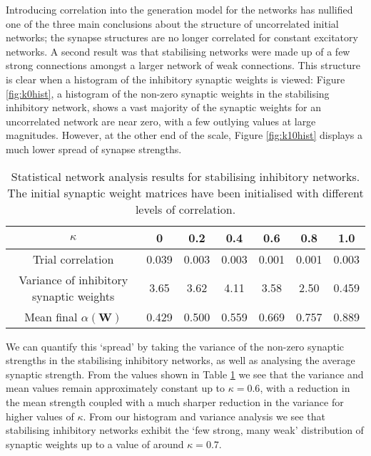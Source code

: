 \documentclass[12pt, a4paper]{article}
\begin{document}
Introducing correlation into the generation model for the networks has nullified one of the three main conclusions about the structure of uncorrelated initial networks; the synapse structures are no longer correlated for constant excitatory networks.  A second result was that stabilising networks were made up of a few strong connections amongst a larger network of weak connections.  This structure is clear when a histogram of the inhibitory synaptic weights is viewed: Figure \ref{fig:k0hist}, a histogram of the non-zero synaptic weights in the stabilising inhibitory network, shows a vast majority of the synaptic weights for an uncorrelated network are near zero, with a few outlying values at large magnitudes.  However,  at the other end of the scale, Figure \ref{fig:k10hist} displays a much lower spread of synapse strengths. 

\begin{table}
    \centering
            \begin{tabular}{|c || c c c c c c|}
                \hline
                                $\kappa$     &   0      &  0.2   &    0.4   &   0.6   &   0.8   &   1.0  \\
                \hline
                Trial correlation            &   0.039   &  0.003 &  0.003  & 0.001   & 0.001   &  0.003  \\
                Variance of inhibitory synaptic weights   &   3.65     &  3.62   &  4.11    &  3.58    &   2.50   &  0.459  \\ 
                Mean final $\alpha(\mathbf{W})$           &   0.429    &  0.500  &  0.559   &  0.669   &  0.757   &  0.889  \\ 
                \hline
            \end{tabular}
            \caption{Statistical network analysis results for stabilising inhibitory networks.  The initial synaptic weight matrices have been initialised with different levels of correlation.}
            \label{tab:kCorr}
\end{table} 

We can quantify this `spread' by taking the variance of the non-zero synaptic strengths in the stabilising inhibitory networks, as well as analysing the average synaptic strength.  From the  values shown in Table \ref{tab:kCorr} we see that the variance and mean values remain approximately constant up to $\kappa = 0.6$, with a reduction in the mean strength coupled with a much sharper reduction in the variance for higher values of $\kappa$.  From our histogram and variance analysis we see that stabilising inhibitory networks exhibit the `few strong, many weak' distribution of synaptic weights up to a value of around $\kappa = 0.7$.  
\end{document}

